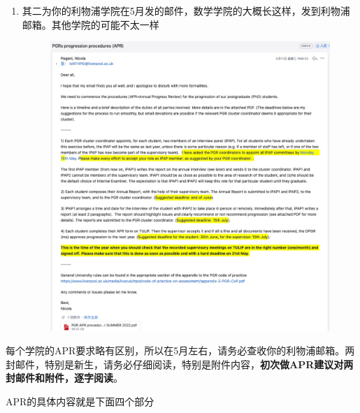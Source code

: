 \begin{enumerate}
    \item 
        \begin{minipage}{0.3\textwidth}
            其二为你的利物浦学院在5月发的邮件，数学学院的大概长这样，发到利物浦邮箱。其他学院的可能不太一样
        \end{minipage}
        \begin{minipage}{0.63\textwidth}
            \begin{figure}[H]
                \includegraphics[width=0.95\columnwidth, right]{author-folder/Kai.Wu/APR_liverpool_email.jpg}
            \end{figure}
        \end{minipage}

\end{enumerate}

每个学院的APR要求略有区别，所以在5月左右，请务必查收你的利物浦邮箱。两封邮件，特别是新生，请务必仔细阅读，特别是附件内容，\textbf{初次做APR建议对两封邮件和附件，逐字阅读}。

APR的具体内容就是下面四个部分
